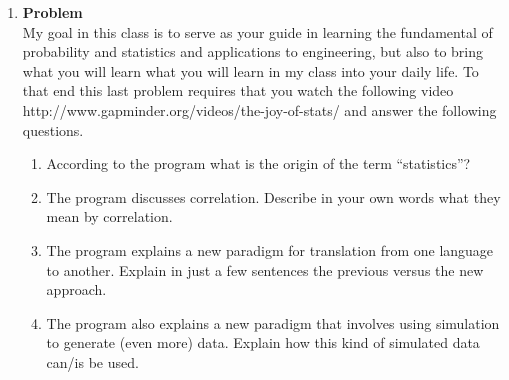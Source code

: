 \documentclass[12pt]{article}
\newenvironment{Ex}{\textbf{Problem}\vspace{.75em}\\}{}
\begin{document}
\begin{enumerate}
\begin{Ex}
\begin{solution}
\begin{enumerate}
        rational number. Thus the collection of rational numbers are
        countable.
      \item Since both $A$ and $B$ are individually countable, the
        collection which describes the logical OR of $A$ and $B$ must
        be countable as well.
      \item Suppose not. Suppose that there exists an enumeration of
        all elements of $A$. Since $A$ is countable, there must exist
        every possible enumeration of an infinite sequence. If each
        sequence in $A$ is infinite, we can always generate a new
        sequence which differs by at least one digit in the
        sequence. Thus it is impossible for $A$ to be countable.
      \item Real numbers $[0,1]$ are uncountable becuase there is an
        infinitely small distance between two numbers, which makes it
        impossible to enumerate each individual value.
      \end{enumerate}
    \end{solution}
  \end{Ex}
\item 
  \begin{Ex}
    My goal in this class is to serve as your guide in learning the
    fundamental of probability and statistics and applications to
    engineering, but also to bring what you will learn what you will
    learn in my class into your daily life. To that end this last
    problem requires that you watch the following video
    http://www.gapminder.org/videos/the-joy-of-stats/ and answer the
    following questions.
    \begin{enumerate}
    \item According to the program what is the origin of the term
      ``statistics''?
    \item The program discusses correlation. Describe in your own
      words what they mean by correlation.
    \item The program explains a new paradigm for translation from one
      language to another. Explain in just a few sentences the
      previous versus the new approach.
    \item The program also explains a new paradigm that involves using
      simulation to generate (even more) data. Explain how this kind
      of simulated data can/is be used.
    \end{enumerate}
    \begin{solution} \hfill
      \begin{enumerate}

\end{enumerate}
\end{solution}
\end{Ex}
\end{enumerate}
\end{document}

